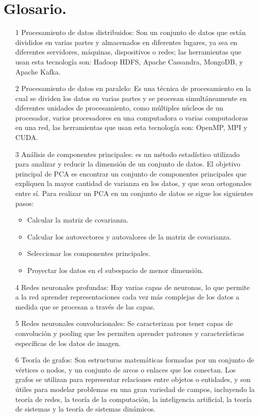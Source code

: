 \documentclass{article}
\theoremstyle{mytheoremstyle}
\theoremstyle{mytheoremstyle}
\theoremstyle{myproblemstyle}
\begin{document}
\section{Glosario.}
\begin{itemize}
    
    \item [1]Procesamiento de datos distribuidos: Son un conjunto de datos que están divididos en varias partes y almacenados en diferentes lugares, ya sea en diferentes servidores, máquinas, dispositivos o redes; las herramientas que usan esta tecnología son: Hadoop HDFS, Apache Cassandra, MongoDB, y Apache Kafka.
    \item [2]Procesamiento de datos en paralelo: Es una técnica de procesamiento en la cual se dividen los datos en varias partes y se procesan simultáneamente en diferentes unidades de procesamiento, como múltiples núcleos de un procesador, varios procesadores en una computadora o varias computadoras en una red, las herramientas que usan esta tecnología son: OpenMP, MPI y CUDA.
    \item [3]Análisis de componentes principales: es un método estadístico utilizado para analizar y reducir la dimensión de un conjunto de datos. El objetivo principal de PCA es encontrar un conjunto de componentes principales que expliquen la mayor cantidad de varianza en los datos, y que sean ortogonales entre sí. Para realizar un PCA en un conjunto de datos se sigue los siguientes pasos:
    \begin{itemize}
        \item Calcular la matriz de covarianza.
        \item Calcular los autovectores y autovalores de la matriz de covarianza.
        \item Seleccionar los componentes principales.
        \item Proyectar los datos en el subespacio de menor dimensión.
    \end{itemize}
    \item [4]Redes neuronales profundas: Hay varias capas de neuronas, lo que permite a la red aprender representaciones cada vez más complejas de los datos a medida que se procesan a través de las capas.
    \item [5]Redes neuronales convolucionales: Se caracterizan por tener capas de convolución y pooling que les permiten aprender patrones y características específicas de los datos de imagen.
    \item [6]Teoría de grafos: Son estructuras matemáticas formadas por un conjunto de vértices o nodos, y un conjunto de arcos o enlaces que los conectan. Los grafos se utilizan para representar relaciones entre objetos o entidades, y son útiles para modelar problemas en una gran variedad de campos, incluyendo la teoría de redes, la teoría de la computación, la inteligencia artificial, la teoría de sistemas y la teoría de sistemas dinámicos.

\end{itemize}
\end{document}
